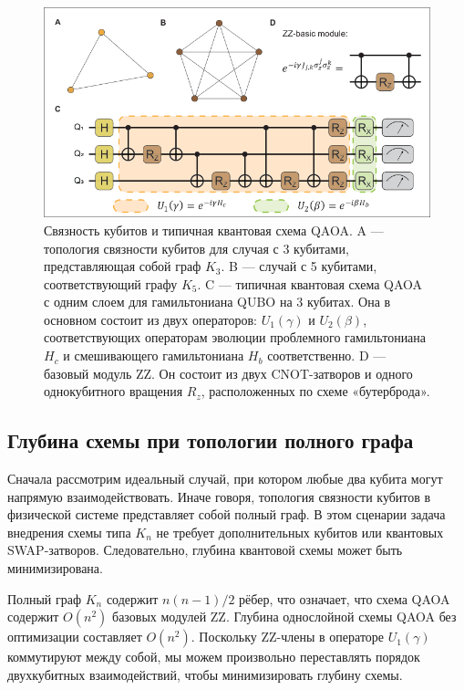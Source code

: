 \begin{figure}
    \centering
    \includegraphics[scale=0.6]{inc/fig_11.png}
    \caption{
    Связность кубитов и типичная квантовая схема QAOA. A — топология связности
    кубитов для случая с 3 кубитами, представляющая собой граф $K_3$. B —
    случай с 5 кубитами, соответствующий графу $K_5$. C — типичная квантовая
    схема QAOA с одним слоем для гамильтониана QUBO на 3 кубитах. Она в
    основном состоит из двух операторов: $U_1(\gamma)$ и $U_2(\beta)$,
    соответствующих операторам эволюции проблемного гамильтониана $H_c$ и
    смешивающего гамильтониана $H_b$ соответственно. D — базовый модуль ZZ. Он
    состоит из двух CNOT-затворов и одного однокубитного вращения $R_z$,
    расположенных по схеме «бутерброда».
    }
    \label{fig:fig11}
\end{figure}

\subsection*{Глубина схемы при топологии полного графа}

Сначала рассмотрим идеальный случай, при котором любые два кубита могут
напрямую взаимодействовать. Иначе говоря, топология связности кубитов в
физической системе представляет собой полный граф. В этом сценарии задача
внедрения схемы типа $K_n$ не требует дополнительных кубитов или квантовых
SWAP-затворов. Следовательно, глубина квантовой схемы может быть
минимизирована.

Полный граф $K_n$ содержит $n(n - 1)/2$ рёбер, что означает, что схема QAOA
содержит $O(n^2)$ базовых модулей ZZ. Глубина однослойной схемы QAOA без
оптимизации составляет $O(n^2)$. Поскольку ZZ-члены в операторе $U_1(\gamma)$
коммутируют между собой, мы можем произвольно переставлять порядок двухкубитных
взаимодействий, чтобы минимизировать глубину схемы.

